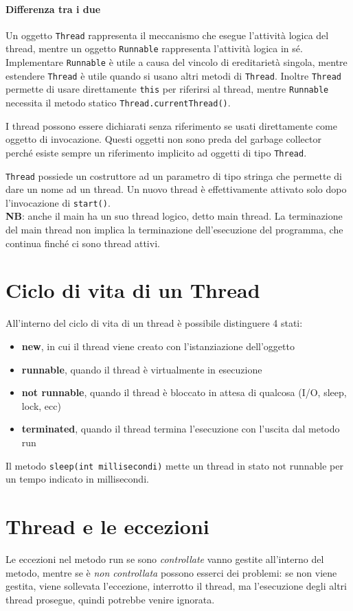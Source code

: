 \paragraph{Differenza tra i due} Un oggetto \texttt{Thread} rappresenta il meccanismo che esegue l'attività logica del thread, mentre un oggetto \texttt{Runnable} rappresenta l'attività logica in sé.
Implementare \texttt{Runnable} è utile a causa del vincolo di ereditarietà singola, mentre estendere \texttt{Thread} è utile quando si usano altri metodi di \texttt{Thread}. Inoltre \texttt{Thread} permette di usare direttamente \texttt{this} per riferirsi al thread, mentre \texttt{Runnable} necessita il metodo statico \texttt{Thread.currentThread()}.

I thread possono essere dichiarati senza riferimento se usati direttamente come oggetto di invocazione. Questi oggetti non sono preda del garbage collector perché esiste sempre un riferimento implicito ad oggetti di tipo \texttt{Thread}.

\texttt{Thread} possiede un costruttore ad un parametro di tipo stringa che permette di dare un nome ad un thread. Un nuovo thread è effettivamente attivato solo dopo l'invocazione di \texttt{start()}. \\
\textbf{NB}: anche il main ha un suo thread logico, detto main thread. La terminazione del main thread non implica la terminazione dell'esecuzione del programma, che continua finché ci sono thread attivi.


\section{Ciclo di vita di un Thread}
All'interno del ciclo di vita di un thread è possibile distinguere 4 stati:
\begin{itemize}
\item \textbf{new}, in cui il thread viene creato con l'istanziazione dell'oggetto
\item \textbf{runnable}, quando il thread è virtualmente in esecuzione
\item \textbf{not runnable}, quando il thread è bloccato in attesa di qualcosa (I/O, sleep, lock, ecc)
\item \textbf{terminated}, quando il thread termina l'esecuzione con l'uscita dal metodo run
\end{itemize}
Il metodo \texttt{sleep(int millisecondi)} mette un thread in stato not runnable per un tempo indicato in millisecondi.

\section{Thread e le eccezioni}
Le eccezioni nel metodo run se sono \textit{controllate} vanno gestite all'interno del metodo, mentre se è \textit{non controllata} possono esserci dei problemi: se non viene gestita, viene sollevata l'eccezione, interrotto il thread, ma l'esecuzione degli altri thread prosegue, quindi potrebbe venire ignorata. 

